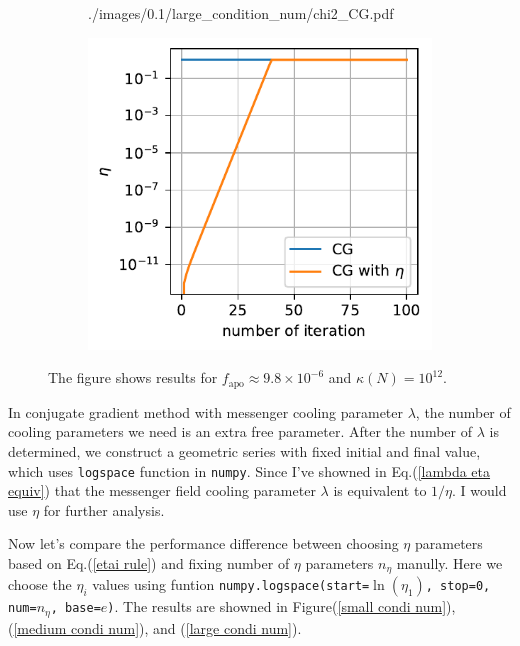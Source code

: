 \documentclass[11pt, letterpaper]{article}
\begin{document}
\begin{figure}[htb]
\begin{subfigure}{0.33\textwidth}
        {./images/0.1/large_condition_num/chi2_CG.pdf}
    \caption{}
    \label{large condi num chi2 CG}
\end{subfigure}%
\begin{subfigure}{0.33\textwidth}
    \centering
    \includegraphics[width=\linewidth]
        {./images/0.1/large_condition_num/eta_CG.pdf}
    \caption{}
    \label{large condi num eta CG}
\end{subfigure}
\caption{The figure shows results for $f_{\text{apo}}\approx 9.8\times10^{-6}$ 
    and $\kappa(N) = 10^{12}$.
}
\label{large condi num CG}
\end{figure}

In conjugate gradient method with messenger cooling parameter $\lambda$, 
the number of cooling parameters we need is an extra free parameter.
After the number of $\lambda$ is determined, we construct a geometric series
with fixed initial and final value, which uses \texttt{logspace}
function in \texttt{numpy}.
Since I've showned in Eq.(\ref{lambda eta equiv}) that the messenger field
cooling parameter $\lambda$ is equivalent to $1/\eta$.
I would use $\eta$ for further analysis.

Now let's compare the performance difference between choosing $\eta$
parameters based on Eq.(\ref{etai rule})
and fixing number of $\eta$ parameters $n_{\eta}$ manully.
Here we choose the $\eta_i$ values using funtion
\texttt{numpy.logspace(start=$\ln(\eta_1)$, stop=0, num=$n_{\eta}$, base=$e$)}.
The results are showned in Figure(\ref{small condi num}),
(\ref{medium condi num}), and (\ref{large condi num}).
\end{document}
